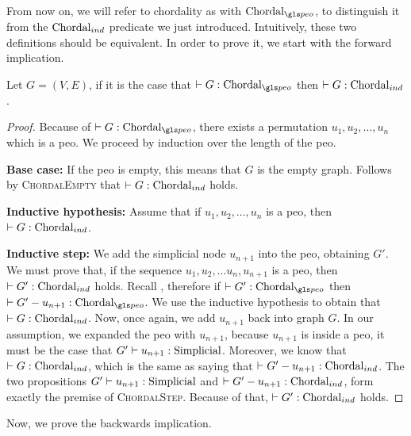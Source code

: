 From now on, we will refer to chordality as  with $\chordalpeosymbol$, to distinguish it from the $\chordalindsymbol$ predicate we just introduced. Intuitively, these two definitions should be equivalent. In order to prove it, we start with the forward implication.

\begin{lemma}\label{lem:chordal12}
    Let $G = (V, E)$, if it is the case that $\chordalpeo{G}$ then $\chordalind{G}$.
\end{lemma}

\begin{proof}
    Because of $\chordalpeo{G}$, there exists a permutation $u_1, u_2, \dots, u_n$ which is a \gls{peo}. We proceed by induction over the length of the \gls{peo}.

    \medskip

    \textbf{Base case:}
    If the \gls{peo} is empty, this means that $G$ is the empty graph. Follows by \textsc{ChordalEmpty} that $\chordalind{G}$ holds.

    \medskip

    \textbf{Inductive hypothesis:}
    Assume that if $u_1, u_2, \dots, u_n$ is a \gls{peo}, then $\chordalind{G}$.

    \medskip

    \textbf{Inductive step:}
    We add the simplicial node $u_{n+1}$ into the \gls{peo}, obtaining $G'$. We must prove that, if the sequence $u_1, u_2, \dots u_n, u_{n+1}$ is a \gls{peo}, then $\chordalind{G'}$ holds.
    Recall , therefore if $\chordalpeo{G'}$ then $\chordalpeo{G' - u_{n+1}}$. We use the inductive hypothesis to obtain that $\chordalind{G}$. Now, once again, we add $u_{n+1}$ back into graph $G$. In our assumption, we expanded the \gls{peo} with $u_{n+1}$, because $u_{n+1}$ is inside a \gls{peo}, it must be the case that $\simplicial{u_{n+1}}{G'}$. Moreover, we know that $\chordalind{G}$, which is the same as saying that $\chordalind{G' - u_{n+1}}$. The two propositions $\simplicial{u_{n+1}}{G'}$ and $\chordalind{G' - u_{n+1}}$, form exactly the premise of \textsc{ChordalStep}. Because of that, $\chordalind{G'}$ holds.
\end{proof}

Now, we prove the backwards implication.

